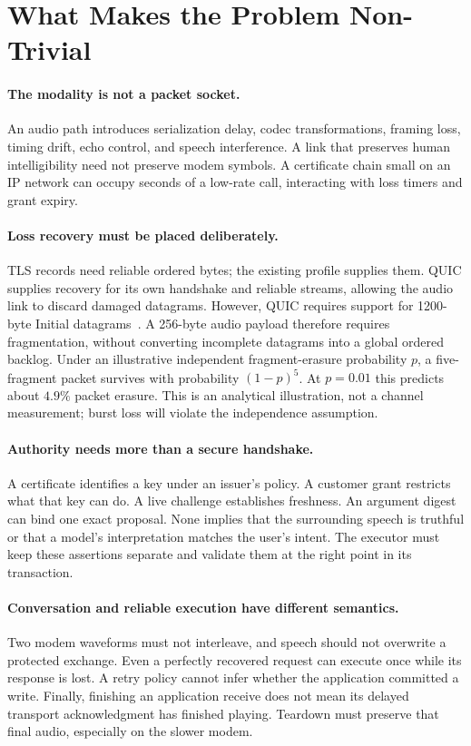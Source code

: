 \section{What Makes the Problem Non-Trivial}
\label{sec:challenges}
\paragraph{The modality is not a packet socket.}
An audio path introduces serialization delay, codec transformations, framing
loss, timing drift, echo control, and speech interference. A link that preserves
human intelligibility need not preserve modem symbols. A certificate chain
small on an IP network can occupy seconds of a low-rate call, interacting with
loss timers and grant expiry.

\paragraph{Loss recovery must be placed deliberately.}
TLS records need reliable ordered bytes; the existing profile supplies them.
QUIC supplies recovery for its own handshake and reliable streams, allowing
the audio link to discard damaged datagrams. However, QUIC requires support for
1200-byte Initial datagrams~\cite{rfc9000}. A 256-byte audio payload therefore
requires fragmentation, without converting incomplete datagrams into a global
ordered backlog. Under an illustrative independent fragment-erasure probability
$p$, a five-fragment packet survives with probability $(1-p)^5$. At $p=0.01$
this predicts about $4.9\%$ packet erasure. This is an analytical illustration,
not a channel measurement; burst loss will violate the independence assumption.

\paragraph{Authority needs more than a secure handshake.}
A certificate identifies a key under an issuer's policy. A customer grant
restricts what that key can do. A live challenge establishes freshness. An
argument digest can bind one exact proposal. None implies that the surrounding
speech is truthful or that a model's interpretation matches the user's intent.
The executor must keep these assertions separate and validate them at the
right point in its transaction.

\paragraph{Conversation and reliable execution have different semantics.}
Two modem waveforms must not interleave, and speech should not overwrite a
protected exchange. Even a perfectly recovered request can execute once while
its response is lost. A retry policy cannot infer whether the application
committed a write. Finally, finishing an application receive does not mean its
delayed transport acknowledgment has finished playing. Teardown must preserve
that final audio, especially on the slower modem.

